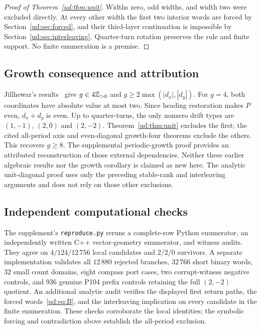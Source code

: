 \begin{proof}[Proof of Theorem~\ref{ud:thm:unit}]
Widths zero, odd widths, and width two were excluded directly. At every
other width the first two interior words are forced by Section~\ref{ud:sec:forced}, and their
third-layer continuation is impossible by Section~\ref{ud:sec:interleaving}. Quarter-turn rotation
preserves the rule and finite support. No finite enumeration is a premise.
\end{proof}

\subsection{Growth consequence and attribution}
Jillhewar's results~\cite[Section~7, signed-residue theorem and the axis/even-diagonal growth-four theorems]{Jillhewar2026} give $g\in4\mathbb Z_{>0}$ and
$g\ge2\max(|d_x|,|d_y|)$. For $g=4$, both coordinates have absolute value at
most two. Since heading restoration makes $P$ even, $d_x+d_y$ is even.
Up to quarter-turns, the only nonzero drift types are $(1,-1)$, $(2,0)$ and
$(2,-2)$. Theorem~\ref{ud:thm:unit} excludes the first; the cited all-period
axis and even-diagonal growth-four theorems exclude the others. This recovers
$g\ge8$. The supplemental periodic-growth proof provides an attributed reconstruction
of those external dependencies. Neither these earlier algebraic results nor
the growth corollary is claimed as new here. The analytic unit-diagonal proof
uses only the preceding stable-rank and interleaving arguments and does not rely on those other exclusions.

\subsection{Independent computational checks}
The supplement's \texttt{reproduce.py} reruns a complete-row Python enumerator,
an independently written C++ vector-geometry enumerator, and witness audits.
They agree on $4/124/12\,756$ local candidates and $2/2/0$ survivors. A separate
implementation validates all $12\,880$ rejected branches, $32\,766$ short binary
words, $32$ small count domains, eight compass port cases, two corrupt-witness
negative controls, and $936$ genuine P104 prefix controls retaining the full
$(2,-2)$ quotient. An additional analytic audit verifies the displayed first
return paths, the forced words~\eqref{ud:eq:B}, and the interleaving implication
on every candidate in the finite enumeration. These checks corroborate the
local identities; the symbolic forcing and contradiction above establish the
all-period exclusion.
